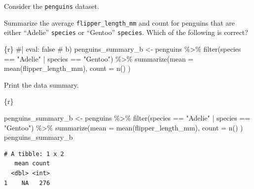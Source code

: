 \documentclass[
  letterpaper,
  DIV=11,
  numbers=noendperiod]{scrreprt}
\newenvironment{Shaded}{\begin{snugshade}}{\end{snugshade}}
\newcommand{\AttributeTok}[1]{\textcolor[rgb]{0.40,0.45,0.13}{#1}}
\newcommand{\CommentTok}[1]{\textcolor[rgb]{0.37,0.37,0.37}{#1}}
\newcommand{\FunctionTok}[1]{\textcolor[rgb]{0.28,0.35,0.67}{#1}}
\newcommand{\InformationTok}[1]{\textcolor[rgb]{0.37,0.37,0.37}{#1}}
\newcommand{\NormalTok}[1]{\textcolor[rgb]{0.00,0.23,0.31}{#1}}
\newcommand{\OtherTok}[1]{\textcolor[rgb]{0.00,0.23,0.31}{#1}}
\newcommand{\SpecialCharTok}[1]{\textcolor[rgb]{0.37,0.37,0.37}{#1}}
\newcommand{\StringTok}[1]{\textcolor[rgb]{0.13,0.47,0.30}{#1}}
\begin{document}
\begin{tcolorbox}[enhanced jigsaw, colframe=quarto-callout-note-color-frame, breakable, colback=white, toprule=.15mm, leftrule=.75mm, left=2mm, opacityback=0, rightrule=.15mm, arc=.35mm, bottomrule=.15mm]

Consider the \texttt{penguins} dataset.

Summarize the average \texttt{flipper\_length\_mm} and count for
penguins that are either ``Adelie'' \texttt{species} or ``Gentoo''
\texttt{species}. Which of the following is correct?

\begin{Shaded}
\begin{Highlighting}[]
\InformationTok{\textasciigrave{}\textasciigrave{}\textasciigrave{}\{r\}}
\CommentTok{\#| eval: false}
\CommentTok{\# b)}
\NormalTok{penguins\_summary\_b }\OtherTok{\textless{}{-}}\NormalTok{ penguins }\SpecialCharTok{\%\textgreater{}\%} 
  \FunctionTok{filter}\NormalTok{(species }\SpecialCharTok{==} \StringTok{"Adelie"} \SpecialCharTok{|}\NormalTok{ species }\SpecialCharTok{==} \StringTok{"Gentoo"}\NormalTok{) }\SpecialCharTok{\%\textgreater{}\%} 
  \FunctionTok{summarize}\NormalTok{(}\AttributeTok{mean =} \FunctionTok{mean}\NormalTok{(flipper\_length\_mm),}
            \AttributeTok{count =} \FunctionTok{n}\NormalTok{() )}
\InformationTok{\textasciigrave{}\textasciigrave{}\textasciigrave{}}
\end{Highlighting}
\end{Shaded}

\end{tcolorbox}

\begin{tcolorbox}[enhanced jigsaw, colframe=quarto-callout-note-color-frame, breakable, colback=white, toprule=.15mm, leftrule=.75mm, left=2mm, opacityback=0, rightrule=.15mm, arc=.35mm, bottomrule=.15mm]

Print the data summary.

\begin{Shaded}
\begin{Highlighting}[]
\InformationTok{\textasciigrave{}\textasciigrave{}\textasciigrave{}\{r\}}

\NormalTok{penguins\_summary\_b }\OtherTok{\textless{}{-}}\NormalTok{ penguins }\SpecialCharTok{\%\textgreater{}\%} 
  \FunctionTok{filter}\NormalTok{(species }\SpecialCharTok{==} \StringTok{"Adelie"} \SpecialCharTok{|}\NormalTok{ species }\SpecialCharTok{==} \StringTok{"Gentoo"}\NormalTok{) }\SpecialCharTok{\%\textgreater{}\%} 
  \FunctionTok{summarize}\NormalTok{(}\AttributeTok{mean =} \FunctionTok{mean}\NormalTok{(flipper\_length\_mm),}
            \AttributeTok{count =} \FunctionTok{n}\NormalTok{() )}
\NormalTok{penguins\_summary\_b}
\InformationTok{\textasciigrave{}\textasciigrave{}\textasciigrave{}}
\end{Highlighting}
\end{Shaded}

\begin{verbatim}
# A tibble: 1 x 2
   mean count
  <dbl> <int>
1    NA   276
\end{verbatim}

\end{tcolorbox}
\end{document}
